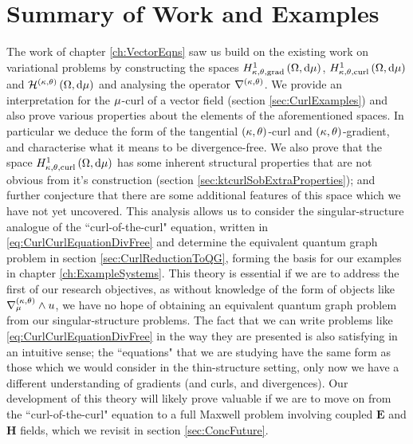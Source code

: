 \section{Summary of Work and Examples} \label{sec:ConcWork}
The work of chapter \ref{ch:VectorEqns} saw us build on the existing work on variational problems by constructing the spaces $H^1_{\kappa,\theta,\mathrm{grad}}\left( \Omega, \mathrm{d}\mu \right)$, $H^1_{\kappa,\theta,\mathrm{curl}}\left( \Omega, \mathrm{d}\mu \right)$ and $\mathcal{H}^{\left( \kappa, \theta \right)}\left( \Omega, \mathrm{d}\mu \right)$ and analysing the operator $\nabla^{\left( \kappa, \theta \right)}$.
We provide an interpretation for the $\mu$-curl of a vector field (section \ref{sec:CurlExamples}) and also prove various properties about the elements of the aforementioned spaces.
In particular we deduce the form of the tangential $\left( \kappa, \theta \right)$-curl and $\left( \kappa, \theta \right)$-gradient, and characterise what it means to be divergence-free.
We also prove that the space $H^1_{\kappa,\theta,\mathrm{curl}}\left( \Omega, \mathrm{d}\mu \right)$ has some inherent structural properties that are not obvious from it's construction (section \ref{sec:ktcurlSobExtraProperties}); and further conjecture that there are some additional features of this space which we have not yet uncovered.
This analysis allows us to consider the singular-structure analogue of the ``curl-of-the-curl" equation, written in \eqref{eq:CurlCurlEquationDivFree} and determine the equivalent quantum graph problem in section \ref{sec:CurlReductionToQG}, forming the basis for our examples in chapter \ref{ch:ExampleSystems}.
This theory is essential if we are to address the first of our research objectives, as without knowledge of the form of objects like $\nabla_{\mu}^{\left( \kappa, \theta \right)}\wedge u$, we have no hope of obtaining an equivalent quantum graph problem from our singular-structure problems.
The fact that we can write problems like \eqref{eq:CurlCurlEquationDivFree} in the way they are presented is also satisfying in an intuitive sense; the ``equations" that we are studying have the same form as those which we would consider in the thin-structure setting, only now we have a different understanding of gradients (and curls, and divergences).
Our development of this theory will likely prove valuable if we are to move on from the ``curl-of-the-curl" equation to a full Maxwell problem involving coupled $\mathbf{E}$ and $\mathbf{H}$ fields, which we revisit in section \ref{sec:ConcFuture}. \newline

